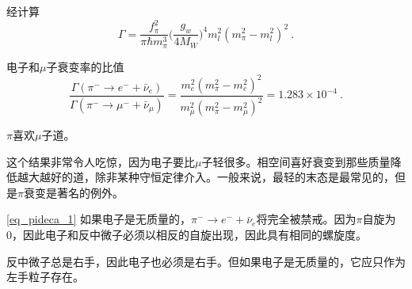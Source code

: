 经计算
\begin{equation}\label{eq_pideca_1}
\Gamma = \frac{f_\pi^2}{\pi \hbar m_\pi^3} \bigg( \frac{g_w}{4 M_W} \bigg)^4 m_l^2 (m_\pi^2 - m_l^2)^2 ~.
\end{equation}

电子和$\mu$子衰变率的比值
\begin{equation}
\frac{\Gamma(\pi^- \rightarrow e^- +\bar \nu_e)}{\Gamma(\pi^- \rightarrow \mu^- +\bar \nu_\mu)} = \frac{m_e^2(m_\pi^2-m_e^2)^2}{m_\mu^2(m_\pi^2-m_\mu^2)^2} = 1.283 \times 10^{-4}~.
\end{equation}

$\pi$喜欢$\mu$子道。

这个结果非常令人吃惊，因为电子要比$\mu$子轻很多。相空间喜好衰变到那些质量降低越大越好的道，除非某种守恒定律介入。一般来说，最轻的末态是最常见的，但是$\pi$衰变是著名的例外。

\autoref{eq_pideca_1} 如果电子是无质量的，$\pi^- \rightarrow e^-+ \bar \nu_e$将完全被禁戒。因为$\pi$自旋为0，因此电子和反中微子必须以相反的自旋出现，因此具有相同的螺旋度。

反中微子总是右手，因此电子也必须是右手。但如果电子是无质量的，它应只作为左手粒子存在。